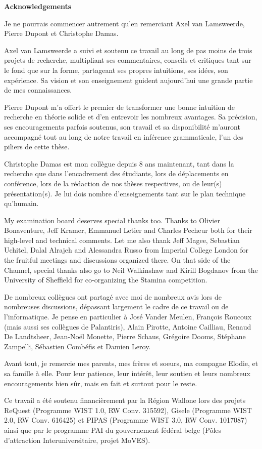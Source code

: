 \begin{center}
\textbf{\large Acknowledgements}
\end{center}

Je ne pourrais commencer autrement qu'en remerciant Axel van Lamsweerde, Pierre 
Dupont et Christophe Damas.

Axel van Lamsweerde a suivi et soutenu ce travail au long de pas moins de 
trois projets de recherche, multipliant ses commentaires, conseils et critiques 
tant sur le fond que sur la forme, partageant ses propres intuitions, ses id\'ees,
son exp\'erience. Sa vision et son enseignement guident aujourd'hui une 
grande partie de mes connaissances.

Pierre Dupont m'a offert le premier de transformer une bonne intuition de 
recherche en th\'eorie solide et d'en entrevoir les nombreux avantages. Sa 
pr\'ecision, ses encouragements parfois soutenus, son travail et sa 
disponibilit\'e m'auront accompagn\'e tout au long de notre travail en 
inf\'erence grammaticale, l'un des piliers de cette th\`ese.

Christophe Damas est mon coll\`egue depuis 8 ans maintenant, tant dans la 
recherche que dans l'encadrement des \'etudiants, lors de d\'eplacements en 
conf\'erence, lors de la r\'edaction de nos th\`eses respectives, ou de leur(s) 
pr\'esentation(s). Je lui dois nombre d'enseignements tant sur le plan technique 
qu'humain.

My examination board deserves special thanks too. Thanks to Olivier Bonaventure, 
Jeff Kramer, Emmanuel Letier and Charles Pecheur both for their high-level and 
technical comments. Let me also thank Jeff Magee, Sebastian Uchitel, Dalal 
Alrajeh and Alessandra Russo from Imperial College London for the fruitful 
meetings and discussions organized there. On that side of the Channel, special 
thanks also go to Neil Walkinshaw and Kirill Bogdanov from the University of 
Sheffield for co-organizing the Stamina competition.

De nombreux coll\`egues ont partag\'e avec moi de nombreux avis lors de 
nombreuses discussions, d\'epassant largement le cadre de ce travail ou 
de l'informatique. Je pense en particulier \`a Jos\'e Vander Meulen, 
Fran\c{c}ois Roucoux (mais aussi ses coll\`egues de Palantiris), Alain Pirotte,
Antoine Cailliau, Renaud De Landtsheer, Jean-No\"el Monette, Pierre Schaus, 
Gr\'egoire Dooms, St\'ephane Zampelli, S\'ebastien Comb\'efis et Damien Leroy.

Avant tout, je remercie mes parents, mes fr\`eres et soeurs, ma compagne Elodie, 
et sa famille \`a elle. Pour leur patience, leur int\'er\^et, leur soutien et 
leurs nombreux encouragements bien s\^ur, mais en fait et surtout pour le reste.

Ce travail a \'et\'e soutenu financi\`erement par la R\'egion Wallone lors des 
projets ReQuest (Programme WIST 1.0, RW Conv. 315592), Gisele (Programme WIST 2.0, 
RW Conv. 616425) et PIPAS (Programme WIST 3.0, RW Conv. 1017087) ainsi que par 
le programme PAI du gouvernement f\'ed\'eral belge (P\^oles d'attraction 
Interuniversitaire, projet MoVES).
